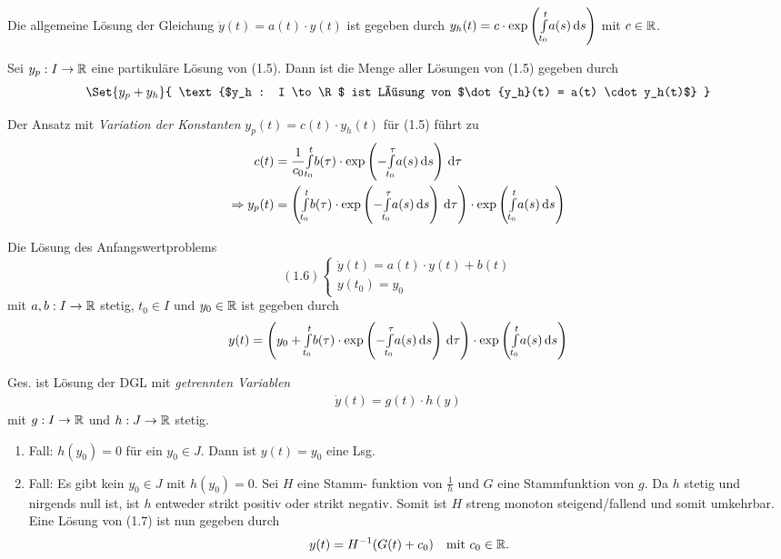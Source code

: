 \documentclass{cheat-sheet}
\begin{document}
\begin{satz}
  Die allgemeine Lösung der Gleichung $\dot{y}(t) = a(t) \cdot y(t)$ ist gegeben durch $y_h(t) = c \cdot \exp\left({\textstyle \int\limits_{t_0}^{t}} a(s) \,\mathrm{d} s\right)$ mit $c \in \mathbb{R}$.
\end{satz}

\begin{satz}
  Sei $y_p : I \to \mathbb{R}$ eine partikuläre Lösung von (1.5). Dann ist die Menge aller Lösungen von (1.5) gegeben durch
  \[ \Set{ y_p + y_h }{ \text{$y_h : I \to \R$ ist Lösung von $\dot{y_h}(t) = a(t) \cdot y_h(t)$} } \]
\end{satz}

\begin{bem}
  Der Ansatz mit \emph{Variation der Konstanten} $y_p(t) = c(t) \cdot y_h(t)$ für (1.5) führt zu
  \begin{align*}
    c(t) &= \frac{1}{c_0} {\textstyle \int\limits_{t_0}^{t}} b(\tau) \cdot \exp\left( - {\textstyle \int\limits_{t_0}^{\tau}} a(s) \,\mathrm{d} s \right) \,\mathrm{d} \tau\\
    \Rightarrow y_p(t) &= \left( {\textstyle \int\limits_{t_0}^{t}} b(\tau) \cdot \exp\left( - {\textstyle \int\limits_{t_0}^{\tau}} a(s) \,\mathrm{d} s \right) \,\mathrm{d} \tau \right) \cdot \exp\left( {\textstyle \int\limits_{t_0}^{t}} a(s) \,\mathrm{d} s \right)
  \end{align*}
\end{bem}

\begin{kor}
  Die Lösung des Anfangswertproblems
  \[
    (1.6) \left\{ \begin{array}{l}
      \dot{y}(t) = a(t) \cdot y(t) + b(t)\\
      y(t_0) = y_0
    \end{array} \right.
  \]
  mit $a, b : I \to \mathbb{R}$ stetig, $t_0 \in I$ und $y_0 \in \mathbb{R}$ ist gegeben durch
  \[ y(t) = \left( y_0 + {\textstyle \int\limits_{t_0}^{t}} b(\tau) \cdot \exp\left( - {\textstyle \int\limits_{t_0}^{\tau}} a(s) \,\mathrm{d} s \right) \,\mathrm{d} \tau \right) \cdot \exp\left( {\textstyle \int\limits_{t_0}^{t}} a(s) \,\mathrm{d} s \right) \]
\end{kor}

\begin{prob}
  Ges. ist Lösung der DGL mit \emph{getrennten Variablen}
  \begin{align}
    \dot{y}(t) = g(t) \cdot h(y) \tag{1.7}
  \end{align}
  mit $g : I \to \mathbb{R}$ und $h : J \to \mathbb{R}$ stetig.
\end{prob}

\begin{lsg}
  \begin{enumerate}
    \item Fall: $h(y_0) = 0$ für ein $y_0 \in J$. Dann ist $y(t) = y_0$ eine Lsg.
    \item Fall: Es gibt kein $y_0 \in J$ mit $h(y_0) = 0$. Sei $H$ eine Stamm- funktion von $\tfrac{1}{h}$ und $G$ eine Stammfunktion von $g$. Da $h$ stetig und nirgends null ist, ist $h$ entweder strikt positiv oder strikt negativ. Somit ist $H$ streng monoton steigend/fallend und somit umkehrbar. Eine Lösung von (1.7) ist nun gegeben durch
    \[ y(t) = H^{-1}(G(t) + c_0) \quad \text{mit $c_0 \in \mathbb{R}$.} \]
  \end{enumerate}
\end{lsg}
\end{document}
